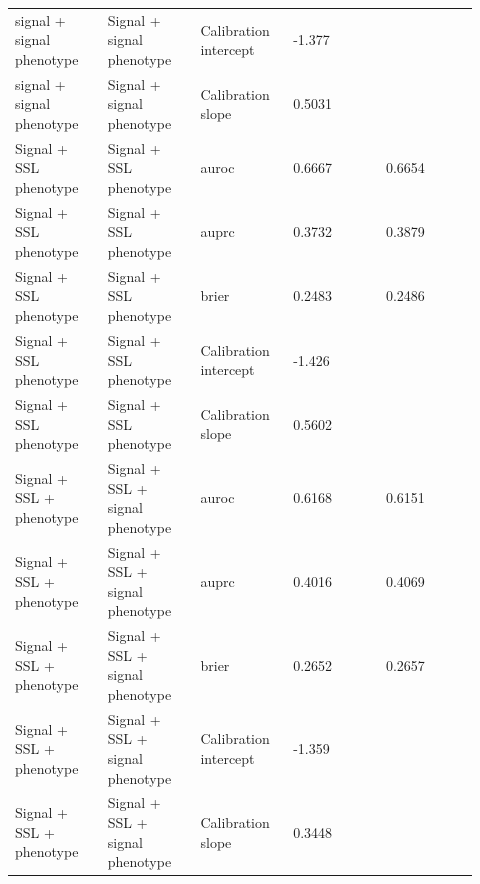 \documentclass[utf8]{frontiers_suppmat}
\begin{document}
\begin{landscape}
\begin{longtable}{L{0.184\linewidth} L{0.184\linewidth} L{0.184\linewidth} L{0.184\linewidth} L{0.184\linewidth}}
signal + signal phenotype & Signal + signal phenotype & Calibration intercept & -\allowbreak{}1.\allowbreak{}377 &  \\
signal + signal phenotype & Signal + signal phenotype & Calibration slope & 0.\allowbreak{}5031 &  \\
Signal + SSL phenotype & Signal + SSL phenotype & auroc & 0.\allowbreak{}6667 & 0.\allowbreak{}6654 \\
Signal + SSL phenotype & Signal + SSL phenotype & auprc & 0.\allowbreak{}3732 & 0.\allowbreak{}3879 \\
Signal + SSL phenotype & Signal + SSL phenotype & brier & 0.\allowbreak{}2483 & 0.\allowbreak{}2486 \\
Signal + SSL phenotype & Signal + SSL phenotype & Calibration intercept & -\allowbreak{}1.\allowbreak{}426 &  \\
Signal + SSL phenotype & Signal + SSL phenotype & Calibration slope & 0.\allowbreak{}5602 &  \\
Signal + SSL + phenotype & Signal + SSL + signal phenotype & auroc & 0.\allowbreak{}6168 & 0.\allowbreak{}6151 \\
Signal + SSL + phenotype & Signal + SSL + signal phenotype & auprc & 0.\allowbreak{}4016 & 0.\allowbreak{}4069 \\
Signal + SSL + phenotype & Signal + SSL + signal phenotype & brier & 0.\allowbreak{}2652 & 0.\allowbreak{}2657 \\
Signal + SSL + phenotype & Signal + SSL + signal phenotype & Calibration intercept & -\allowbreak{}1.\allowbreak{}359 &  \\
Signal + SSL + phenotype & Signal + SSL + signal phenotype & Calibration slope & 0.\allowbreak{}3448 &  \\
\end{longtable}
\normalsize
\end{landscape}
\end{document}

